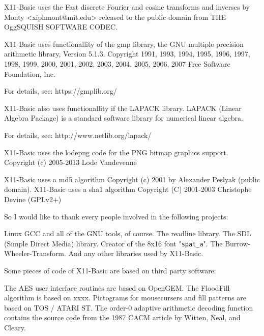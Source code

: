 X11-Basic uses the Fast discrete Fourier and cosine transforms and inverses 
by Monty <xiphmont@mit.edu> released to the public domain from 
THE OggSQUISH SOFTWARE CODEC.

X11-Basic uses functionallity of the gmp library, 
the GNU multiple precision arithmetic library, Version 5.1.3.
   Copyright 1991, 1993, 1994, 1995, 1996, 1997, 1998, 1999, 2000,
2001, 2002, 2003, 2004, 2005, 2006, 2007 Free Software Foundation, Inc.

For details, see: https://gmplib.org/

X11-Basic also uses functionallity if the LAPACK library. 
LAPACK (Linear Algebra Package) is a standard software library for 
numerical linear algebra. 

For details, see: http://www.netlib.org/lapack/

X11-Basic uses the lodepng code for the PNG bitmap graphics support.
Copyright (c) 2005-2013 Lode Vandevenne

X11-Basic uses a md5 algorithm  Copyright (c) 2001 by Alexander Peslyak (public domain).
X11-Basic uses a sha1 algorithm Copyright (C) 2001-2003  Christophe Devine (GPLv2+)

So I would like to thank every people involved in the following projects:

    Linux
    GCC and all of the GNU tools, of course.
    The readline library.
    The SDL (Simple Direct Media) library.
    Creator of the 8x16 font "\verb|spat_a|".
    The Burrow-Wheeler-Transform.
    And any other libraries used by X11-Basic.
 
Some pieces of code of X11-Basic are based on third party software:

    The AES user interface routines are based on OpenGEM.
    The FloodFill algorithm is based on xxxx.
    Pictograms for mousecursers and fill patterns are based on TOS / ATARI ST.
    The order-0 adaptive arithmetic decoding function  contains the source code 
    from the 1987 CACM article by Witten, Neal, and Cleary.
    
